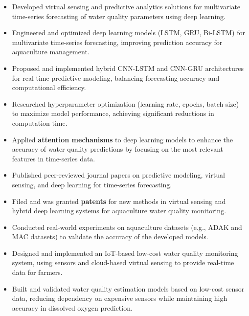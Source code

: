 \documentclass[a4paper,10pt]{article}
\begin{document}
\begin{itemize}
	\item Developed virtual sensing and predictive analytics solutions for multivariate time-series forecasting of water quality parameters using deep learning.
	
	\item Engineered and optimized deep learning models (LSTM, GRU, Bi-LSTM) for multivariate time-series forecasting, improving prediction accuracy for aquaculture management.
	
	\item Proposed and implemented hybrid CNN-LSTM and CNN-GRU architectures for real-time predictive modeling, balancing forecasting accuracy and computational efficiency.
	
	\item Researched hyperparameter optimization (learning rate, epochs, batch size) to maximize model performance, achieving significant reductions in computation time.
	\item Applied \textbf{attention mechanisms} to deep learning models to enhance the accuracy of water quality predictions by focusing on the most relevant features in time-series data.
	\item Published peer-reviewed journal papers on predictive modeling, virtual sensing, and deep learning for time-series forecasting.
	\item Filed and was granted \textbf{patents} for new methods in virtual sensing and hybrid deep learning systems for aquaculture water quality monitoring.
	\item Conducted real-world experiments on aquaculture datasets (e.g., ADAK and MAC datasets) to validate the accuracy of the developed models.
	\item Designed and implemented an IoT-based low-cost water quality monitoring system, using sensors and cloud-based virtual sensing to provide real-time data for farmers.
	\item Built and validated water quality estimation models based on low-cost sensor data, reducing dependency on expensive sensors while maintaining high accuracy in dissolved oxygen prediction.
\end{itemize}
	
\end{document}
